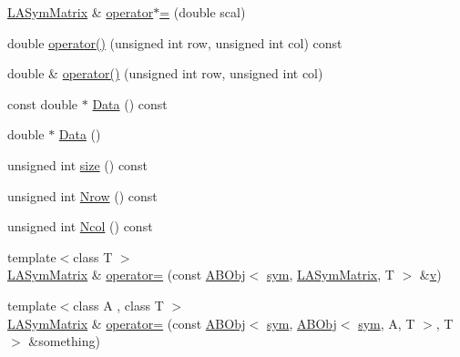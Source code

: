 \begin{DoxyCompactItemize}
\item 
\mbox{\hyperlink{classROOT_1_1Minuit2_1_1LASymMatrix}{L\+A\+Sym\+Matrix}} \& \mbox{\hyperlink{classROOT_1_1Minuit2_1_1LASymMatrix_abb10e4e092df8072bf59de3a0880b336}{operator$\ast$=}} (double scal)
\item 
double \mbox{\hyperlink{classROOT_1_1Minuit2_1_1LASymMatrix_a3a1a954a9e1ab78f255146ccd76d3847}{operator()}} (unsigned int row, unsigned int col) const
\item 
double \& \mbox{\hyperlink{classROOT_1_1Minuit2_1_1LASymMatrix_a580d204fdc526218483e7b2e276da265}{operator()}} (unsigned int row, unsigned int col)
\item 
const double $\ast$ \mbox{\hyperlink{classROOT_1_1Minuit2_1_1LASymMatrix_ab1fb932a4ad517108a3b58473b6d8803}{Data}} () const
\item 
double $\ast$ \mbox{\hyperlink{classROOT_1_1Minuit2_1_1LASymMatrix_abb2b699b82e6aa2803d01e16683433eb}{Data}} ()
\item 
unsigned int \mbox{\hyperlink{classROOT_1_1Minuit2_1_1LASymMatrix_af924c1e0eb1578716a8cb8940cc08563}{size}} () const
\item 
unsigned int \mbox{\hyperlink{classROOT_1_1Minuit2_1_1LASymMatrix_ac76b44933bc4b144b8671c089b8d7ef5}{Nrow}} () const
\item 
unsigned int \mbox{\hyperlink{classROOT_1_1Minuit2_1_1LASymMatrix_a36bb0f349110a80cb742953ae68fc9c5}{Ncol}} () const
\item 
{\footnotesize template$<$class T $>$ }\\\mbox{\hyperlink{classROOT_1_1Minuit2_1_1LASymMatrix}{L\+A\+Sym\+Matrix}} \& \mbox{\hyperlink{classROOT_1_1Minuit2_1_1LASymMatrix_a6c1a413ac701804116e0e395334edc3b}{operator=}} (const \mbox{\hyperlink{classROOT_1_1Minuit2_1_1ABObj}{A\+B\+Obj}}$<$ \mbox{\hyperlink{classROOT_1_1Minuit2_1_1sym}{sym}}, \mbox{\hyperlink{classROOT_1_1Minuit2_1_1LASymMatrix}{L\+A\+Sym\+Matrix}}, T $>$ \&\mbox{\hyperlink{adat__devel_2lib_2hadron_2hadron__timeslice_8cc_a716fc87f5e814be3ceee2405ed6ff22a}{v}})
\item 
{\footnotesize template$<$class A , class T $>$ }\\\mbox{\hyperlink{classROOT_1_1Minuit2_1_1LASymMatrix}{L\+A\+Sym\+Matrix}} \& \mbox{\hyperlink{classROOT_1_1Minuit2_1_1LASymMatrix_ad9610e3f4b18a52ab16644373e179acc}{operator=}} (const \mbox{\hyperlink{classROOT_1_1Minuit2_1_1ABObj}{A\+B\+Obj}}$<$ \mbox{\hyperlink{classROOT_1_1Minuit2_1_1sym}{sym}}, \mbox{\hyperlink{classROOT_1_1Minuit2_1_1ABObj}{A\+B\+Obj}}$<$ \mbox{\hyperlink{classROOT_1_1Minuit2_1_1sym}{sym}}, A, T $>$, T $>$ \&something)

\end{DoxyCompactItemize}
